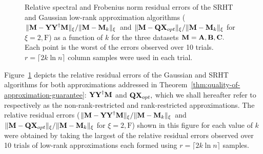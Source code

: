 \begin{figure}[htp]
 \caption{Relative spectral and Frobenius norm residual errors of the SRHT and Gaussian low-rank approximation algorithms
 ($\mbox{}\|{\bm{\mathrm{M}}} - {\bm{\mathrm{Y}}}{{\bm{\mathrm{Y}}}}^\dagger {\ensuremath{\bm{\mathrm{M}}}}\|_{\xi}/\mbox{}\|{\bm{\mathrm{M}}} - {\bm{\mathrm{M}}}_k\|_{\xi}$ and $\mbox{}\|{\bm{\mathrm{M}}} - {\bm{\mathrm{Q}}} {\bm{\mathrm{X}}}_{opt}\|_{\xi}/\mbox{}\|{\bm{\mathrm{M}}} - {\bm{\mathrm{M}}}_k\|_{\xi}$ for $\xi = 2, \mathrm{F}$)
 as a function of $k$ for the three datasets ${\bm{\mathrm{M}}} = {\bm{\mathrm{A}}}, {\bm{\mathrm{B}}}, {\bm{\mathrm{C}}}.$ Each point is the worst of the errors observed over 10 trials. $r = \lceil 2 k \ln n \rceil$ column samples were used in each trial.}
 \label{fig:residualerrors}
\end{figure}
%
Figure~\ref{fig:residualerrors} depicts the relative residual errors of the Gaussian and SRHT algorithms for both approximations addressed in Theorem~\ref{thm:quality-of-approximation-guarantee}: ${\bm{\mathrm{Y}}} {{\bm{\mathrm{Y}}}}^\dagger {\ensuremath{\bm{\mathrm{M}}}}$ and ${\bm{\mathrm{Q}}} {\bm{\mathrm{X}}}_{opt},$ which we shall hereafter refer to respectively as the non-rank-restricted and rank-restricted approximations.
The relative residual errors ($\mbox{}\|{\bm{\mathrm{M}}} - {\bm{\mathrm{Y}}}{{\bm{\mathrm{Y}}}}^\dagger {\ensuremath{\bm{\mathrm{M}}}}\|_{\xi}/\mbox{}\|{\bm{\mathrm{M}}} - {\bm{\mathrm{M}}}_k\|_{\xi}$ and $\mbox{}\|{\bm{\mathrm{M}}} - {\bm{\mathrm{Q}}} {\bm{\mathrm{X}}}_{opt}\|_{\xi}/\mbox{}\|{\bm{\mathrm{M}}} - {\bm{\mathrm{M}}}_k\|_{\xi}$ for $\xi = 2, \mathrm{F}$) shown in this figure for each value of $k$ were obtained by taking the largest of the relative residual errors observed over 10 trials of low-rank approximations each formed using $r = \lceil 2 k \ln n \rceil$ samples.

